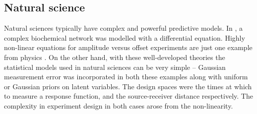 \subsection{Natural science}
Natural sciences typically have complex and powerful predictive models. In \cite{vanlier2012}, a complex biochemical network was modelled with a differential equation. Highly non-linear equations for amplitude versus offset experiments are just one example from physics \cite{berg2003}. On the other hand, with these well-developed theories the statistical models used in natural sciences can be very simple -- Gaussian measurement error was incorporated in both these examples along with uniform or Gaussian priors on latent variables. The design spaces were the times at which to measure a response function, and the source-receiver distance respectively. The complexity in experiment design in both cases arose from the non-linearity.


